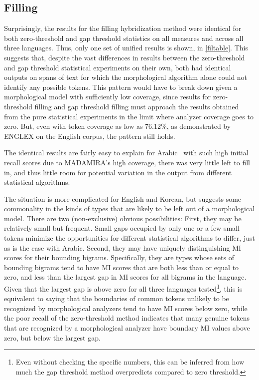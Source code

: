 \subsection{Filling}
\FloatBarrier

Surprisingly, the results for the filling hybridization method were identical for both zero-threshold and gap threshold statistics on all measures and across all three languages. Thus, only one set of unified results is shown, in \ref{filtable}. This suggests that, despite the vast differences in results between the zero-threshold and gap threshold statistical experiments on their own, both had identical outputs on spans of text for which the morphological algorithm alone could not identify any possible tokens. This pattern would have to break down given a morphological model with sufficiently low coverage, since results for zero-threshold filling and gap threshold filling must approach the results obtained from the pure statistical experiments in the limit where analyzer coverage goes to zero. But, even with token coverage as low as 76.12\%, as demonstrated by ENGLEX on the English corpus, the pattern still holds.

The identical results are fairly easy to explain for Arabic\textemdash~ with such high initial recall scores due to MADAMIRA's high coverage, there was very little left to fill in, and thus little room for potential variation in the output from different statistical algorithms.

The situation is more complicated for English and Korean, but suggests some commonality in the kinds of types that are likely to be left out of a morphological model. There are two (non-exclusive) obvious possibilities: First, they may be relatively small but frequent. Small gaps occupied by only one or a few small tokens minimize the opportunities for different statistical algorithms to differ, just as is the case with Arabic. Second, they may have uniquely distinguishing MI scores for their bounding bigrams. Specifically, they are types whose sets of bounding bigrams tend to have MI scores that are both less than or equal to zero, and less than the largest gap in MI scores for all bigrams in the language. Given that the largest gap is above zero for all three languages tested\footnote{Even without checking the specific numbers, this can be inferred from how much the gap threshold method overpredicts compared to zero threshold.}, this is equivalent to saying that the boundaries of common tokens unlikely to be recognized by morphological analyzers tend to have MI scores below zero, while the poor recall of the zero-threshold method indicates that many genuine tokens that are recognized by a morphological analyzer have boundary MI values above zero, but below the largest gap.


